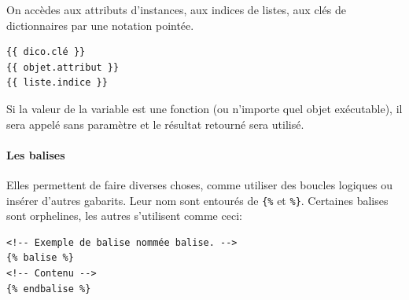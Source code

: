 \documentclass[a4paper, 10pt]{article}
\begin{document}
On accèdes aux attributs d'instances, aux indices de listes, aux clés de dictionnaires par une notation pointée.
\begin{verbatim}
{{ dico.clé }}
{{ objet.attribut }}
{{ liste.indice }}
\end{verbatim}

Si la valeur de la variable est une fonction (ou n'importe quel objet exécutable), il sera appelé sans paramètre et le résultat retourné sera utilisé.

\paragraph{Les balises} Elles permettent de faire diverses choses, comme utiliser des boucles logiques ou insérer d'autres gabarits. Leur nom sont entourés de \texttt{\{\%} et \texttt{\%\}}. Certaines balises sont orphelines, les autres s'utilisent comme ceci:

\begin{verbatim}
<!-- Exemple de balise nommée balise. -->
{% balise %}
<!-- Contenu -->
{% endbalise %}
\end{verbatim}
\end{document}
